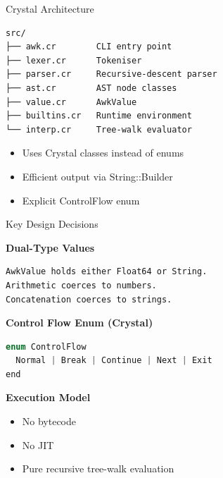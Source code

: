 \documentclass[aspectratio=169]{beamer}
\begin{document}
\begin{frame}[fragile]{Crystal Architecture}

\begin{lstlisting}
src/
├── awk.cr        CLI entry point
├── lexer.cr      Tokeniser
├── parser.cr     Recursive-descent parser
├── ast.cr        AST node classes
├── value.cr      AwkValue
├── builtins.cr   Runtime environment
└── interp.cr     Tree-walk evaluator
\end{lstlisting}

\vspace{0.8em}

\begin{itemize}
  \item Uses Crystal classes instead of enums
  \item Efficient output via String::Builder
  \item Explicit ControlFlow enum
\end{itemize}

\end{frame}

\begin{frame}[fragile]{Key Design Decisions}

\textbf{Dual-Type Values}

\begin{lstlisting}
AwkValue holds either Float64 or String.
Arithmetic coerces to numbers.
Concatenation coerces to strings.
\end{lstlisting}

\vspace{1em}

\textbf{Control Flow Enum (Crystal)}

\begin{lstlisting}[language=C]
enum ControlFlow
  Normal | Break | Continue | Next | Exit
end
\end{lstlisting}

\vspace{1em}

\textbf{Execution Model}

\begin{itemize}
  \item No bytecode
  \item No JIT
  \item Pure recursive tree-walk evaluation
\end{itemize}

\end{frame}
\end{document}

